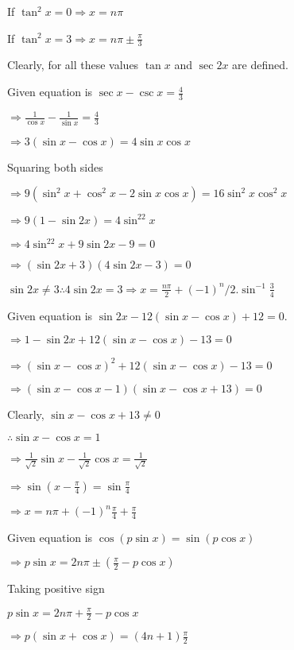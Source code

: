   If $\tan^2x = 0 \Rightarrow x = n\pi$

  If $\tan^2x = 3\Rightarrow x = n\pi\pm\frac{\pi}{3}$

  Clearly, for all these values $\tan x$ and $\sec 2x$ are defined.

\item Given equation is $\sec x - \csc x = \frac{4}{3}$

  $\Rightarrow \frac{1}{\cos x}- \frac{1}{\sin x} = \frac{4}{3}$

  $\Rightarrow 3(\sin x - \cos x) = 4\sin x\cos x$

  Squaring both sides

  $\Rightarrow 9(\sin^2x + \cos^2x - 2\sin x\cos x) = 16\sin^2x\cos^2x$

  $\Rightarrow 9(1 - \sin2x) = 4\sin^22x$

  $\Rightarrow 4\sin^22x + 9\sin2x - 9 = 0$

  $\Rightarrow (\sin2x + 3)(4\sin2x - 3) = 0$

  $\sin2x \neq 3\therefore 4\sin2x = 3 \Rightarrow x = \frac{n\pi}{2} + (-1)^n/2.\sin^{-1}\frac{3}{4}$

\item Given equation is $\sin2x - 12(\sin x - \cos x) + 12 = 0.$

  $\Rightarrow 1 - \sin2x + 12(\sin x - \cos x) - 13 = 0$

  $\Rightarrow (\sin x - \cos x)^2 + 12(\sin x - \cos x) - 13 = 0$

  $\Rightarrow (\sin x - \cos x - 1)(\sin  x - \cos x + 13) = 0$

  Clearly, $\sin x - \cos x + 13 \neq 0$

  $\therefore \sin x - \cos x = 1$

  $\Rightarrow \frac{1}{\sqrt{2}}\sin x - \frac{1}{\sqrt{2}}\cos x = \frac{1}{\sqrt{2}}$

  $\Rightarrow \sin\left(x - \frac{\pi}{4}\right) = \sin\frac{\pi}{4}$

  $\Rightarrow x = n\pi + (-1)^n\frac{\pi}{4} + \frac{\pi}{4}$

\item Given equation is $\cos(p\sin x) = \sin(p\cos x)$

  $\Rightarrow p\sin x = 2n\pi \pm \left(\frac{\pi}{2} - p\cos x\right)$

  Taking positive sign

  $p\sin x = 2n\pi + \frac{\pi}{2} - p\cos x$

  $\Rightarrow p(\sin x + \cos x) = (4n + 1)\frac{\pi}{2}$

